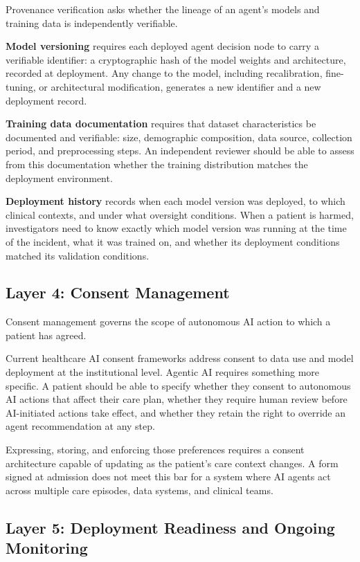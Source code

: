 \documentclass[12pt,a4paper]{article}
\begin{document}
Provenance verification asks whether the lineage of an agent's
models and training data is independently verifiable.

\textbf{Model versioning} requires each deployed agent decision
node to carry a verifiable identifier: a cryptographic hash of
the model weights and architecture, recorded at deployment. Any
change to the model, including recalibration, fine-tuning, or
architectural modification, generates a new identifier and a new
deployment record.

\textbf{Training data documentation} requires that dataset
characteristics be documented and verifiable: size, demographic
composition, data source, collection period, and preprocessing
steps. An independent reviewer should be able to assess from this
documentation whether the training distribution matches the
deployment environment.

\textbf{Deployment history} records when each model version was
deployed, to which clinical contexts, and under what oversight
conditions. When a patient is harmed, investigators need to know
exactly which model version was running at the time of the
incident, what it was trained on, and whether its deployment
conditions matched its validation conditions.

\subsection*{Layer 4: Consent Management}

Consent management governs the scope of autonomous AI action to
which a patient has agreed.

Current healthcare AI consent frameworks address consent to data
use and model deployment at the institutional level. Agentic AI
requires something more specific. A patient should be able to
specify whether they consent to autonomous AI actions that affect
their care plan, whether they require human review before
AI-initiated actions take effect, and whether they retain the
right to override an agent recommendation at any step.

Expressing, storing, and enforcing those preferences requires a
consent architecture capable of updating as the patient's care
context changes. A form signed at admission does not meet this
bar for a system where AI agents act across multiple care
episodes, data systems, and clinical teams.

\subsection*{Layer 5: Deployment Readiness and Ongoing
Monitoring}
\end{document}
